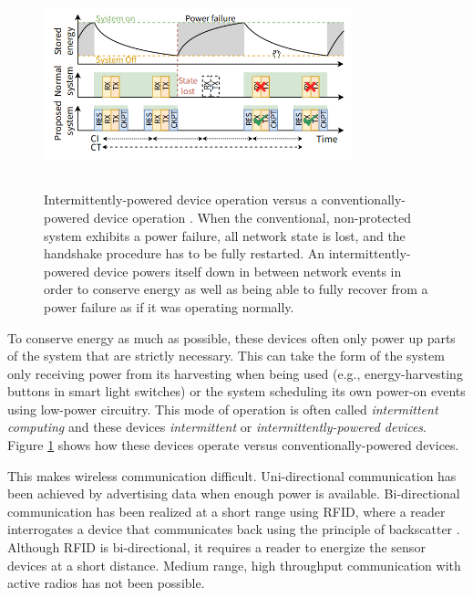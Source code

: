 \begin{figure}[]
    \centering
    \includegraphics[width=0.8\textwidth,height=6cm,keepaspectratio=true]{images/intermittent_device_operation.png}
    \caption{
       Intermittently-powered device operation versus a conventionally-powered device operation \cite{townsend_cufi}. When the conventional, non-protected system exhibits a power failure, all network state is lost, and the handshake procedure has to be fully restarted. An intermittently-powered device powers itself down in between network events in order to conserve energy as well as being able to fully recover from a power failure as if it was operating normally.
    }
    \label{fig:intermittent_operation}
\end{figure}

To conserve energy as much as possible, these devices often only power up parts of the system that are strictly necessary. This can take the form of the system only receiving power from its harvesting when being used (e.g., energy-harvesting buttons in smart light switches) or the system scheduling its own power-on events using low-power circuitry. This mode of operation is often called \textit{intermittent computing} and these devices \textit{intermittent} or \textit{intermittently-powered devices}. Figure \ref{fig:intermittent_operation} shows how these devices operate versus conventionally-powered devices.

This makes wireless communication difficult. Uni-directional communication has been achieved by advertising data when enough power is available. Bi-directional communication has been realized at a short range using RFID, where a reader interrogates a device that communicates back using the principle of backscatter \cite{wisp_2005}. Although RFID is bi-directional, it requires a reader to energize the sensor devices at a short distance. Medium range, high throughput communication with active radios has not been possible.

